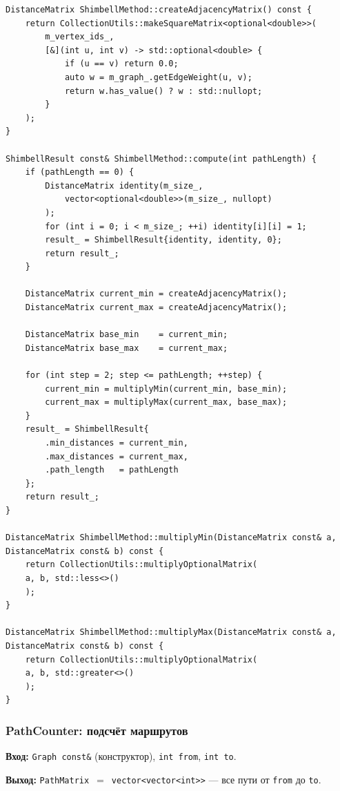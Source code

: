 \begin{lstlisting}[style=cppstyle, caption={Матрица смежности и метод Шимбелла (ShimbellMethod.cc)}]
DistanceMatrix ShimbellMethod::createAdjacencyMatrix() const {
    return CollectionUtils::makeSquareMatrix<optional<double>>(
        m_vertex_ids_,
        [&](int u, int v) -> std::optional<double> {
            if (u == v) return 0.0;
            auto w = m_graph_.getEdgeWeight(u, v);
            return w.has_value() ? w : std::nullopt;
        }
    );
}

ShimbellResult const& ShimbellMethod::compute(int pathLength) {
    if (pathLength == 0) {
        DistanceMatrix identity(m_size_,
            vector<optional<double>>(m_size_, nullopt)
        );
        for (int i = 0; i < m_size_; ++i) identity[i][i] = 1;
        result_ = ShimbellResult{identity, identity, 0};
        return result_;
    }

    DistanceMatrix current_min = createAdjacencyMatrix();
    DistanceMatrix current_max = createAdjacencyMatrix();

    DistanceMatrix base_min    = current_min;
    DistanceMatrix base_max    = current_max;

    for (int step = 2; step <= pathLength; ++step) {
        current_min = multiplyMin(current_min, base_min);
        current_max = multiplyMax(current_max, base_max);
    }
    result_ = ShimbellResult{
        .min_distances = current_min,
        .max_distances = current_max,
        .path_length   = pathLength
    };
    return result_;
}

DistanceMatrix ShimbellMethod::multiplyMin(DistanceMatrix const& a, DistanceMatrix const& b) const {
    return CollectionUtils::multiplyOptionalMatrix(
    a, b, std::less<>()
    );
}

DistanceMatrix ShimbellMethod::multiplyMax(DistanceMatrix const& a, DistanceMatrix const& b) const {
    return CollectionUtils::multiplyOptionalMatrix(
    a, b, std::greater<>()
    );
}
\end{lstlisting}

\subsubsection{PathCounter: подсчёт маршрутов}

\textbf{Вход:} \texttt{Graph const\&} (конструктор), \texttt{int from},
\texttt{int to}.

\textbf{Выход:} \texttt{PathMatrix}~$=$~\texttt{vector<vector<int>>} --- все пути от \texttt{from} до \texttt{to}.


